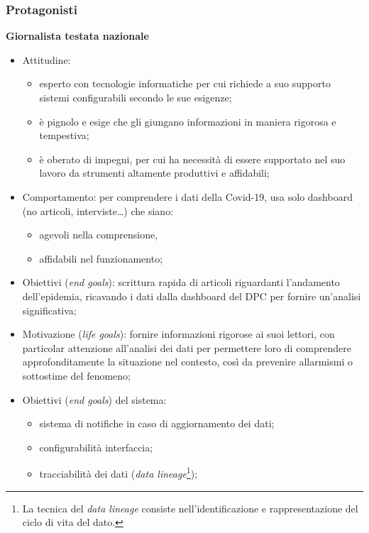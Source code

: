 \subsubsection*{Protagonisti}
\textbf{Giornalista testata nazionale}
\begin{itemize}
	\item Attitudine:
	\begin{itemize}
        \item esperto con tecnologie informatiche per cui richiede a suo supporto sistemi configurabili secondo le sue esigenze;
        \item è pignolo e esige che gli giungano informazioni in maniera rigorosa e tempestiva;
        \item è oberato di impegni, per cui ha necessità di essere supportato nel suo lavoro da strumenti altamente produttivi e affidabili;
    \end{itemize}
    \item Comportamento: per comprendere i dati della Covid-19, usa solo dashboard (no articoli, interviste…) che siano:
	\begin{itemize}
	    \item agevoli nella comprensione,
	    \item affidabili nel funzionamento;
    \end{itemize}
	\item Obiettivi (\textit{end goals}): scrittura rapida di articoli riguardanti l'andamento dell'epidemia, ricavando i dati dalla dashboard del DPC per fornire un'analisi significativa;
	\item Motivazione (\textit{life goals}): fornire informazioni rigorose ai suoi lettori, con particolar attenzione all'analisi dei dati per permettere loro di comprendere approfonditamente la situazione nel contesto, così da prevenire allarmismi o sottostime del fenomeno;
	\item Obiettivi (\textit{end goals}) del sistema:
	\begin{itemize}
	    \item sistema di notifiche in caso di aggiornamento dei dati;
	    \item configurabilità interfaccia;
	    \item tracciabilità dei dati (\textit{data lineage}\footnote{La tecnica del \textit{data lineage} consiste nell’identificazione e rappresentazione del ciclo di vita del dato.});
    \end{itemize}
\end{itemize}

